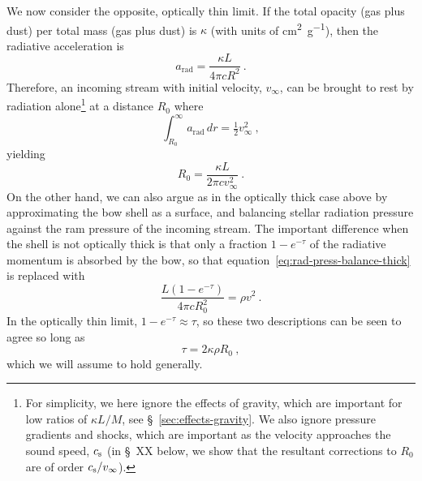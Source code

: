 We now consider the opposite, optically thin limit.  If the total
opacity (gas plus dust) per total mass (gas plus dust) is \(\kappa\) (with
units of \si{cm^2.g^{-1}}), then the radiative acceleration is
\begin{equation}
  \label{eq:rad-accel}
  a_{\text{rad}} = \frac{\kappa L}{4 \pi c R^2} \ .
\end{equation}
Therefore, an incoming stream with initial velocity, \(v_\infty\), can be
brought to rest by radiation alone\footnote{%
  For simplicity, we here ignore the effects of gravity, which are
  important for low ratios of \(\kappa L / M\), see
  \S~\ref{sec:effects-gravity}.  We also ignore pressure gradients and
  shocks, which are important as the velocity approaches the sound
  speed, \(c_{\text{s}}\) (in \S~XX below, we show that the resultant
  corrections to \(R_0\) are of order \(c_{\text{s}} / v_\infty\)).} %
at a distance \(R_0\) where
\begin{equation}
  \label{eq:rad-poten}
  \int_{R_0}^\infty a_{\text{rad}} \, dr = \tfrac12 v_\infty^2 \ , 
\end{equation}
yielding
\begin{equation}
  \label{eq:rad:R0}
  R_0 = \frac{\kappa L}{2\pi c v_\infty^2} \ .
\end{equation}
On the other hand, we can also argue as in the optically thick case
above by approximating the bow shell as a surface, and balancing
stellar radiation pressure against the ram pressure of the incoming
stream.  The important difference when the shell is not optically
thick is that only a fraction \(1 - e^{-\tau}\) of the radiative momentum
is absorbed by the bow, so that
equation~\eqref{eq:rad-press-balance-thick} is replaced with
\begin{equation}
  \label{eq:rad-press-balance-tau}
  \frac{L (1 - e^{-\tau})}{4 \pi c R_0^2} = \rho v^2 \ .
\end{equation}
In the optically thin limit, \(1 - e^{-\tau} \approx \tau\), so these two
descriptions can be seen to agree so long as
\begin{equation}
  \label{eq:tau-thin}
  \tau = 2 \kappa \rho R_0 \ ,
\end{equation}
which we will assume to hold generally.

